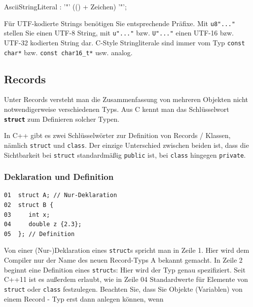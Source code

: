 \documentclass[a4paper]{report}
\begin{document}
\begin{rail}
	AsciiStringLiteral : '"' (() + Zeichen) '"';
\end{rail}
Für UTF-kodierte Strings benötigen Sie entsprechende Präfixe. Mit \texttt{u8"..."} stellen Sie einen UTF-8 String, mit \texttt{u"..."} bzw. \texttt{U"..."} einen UTF-16 bzw. UTF-32 kodierten String dar. C-Style Stringliterale sind immer vom Typ \texttt{const char*} bzw. \texttt{const char16\_t*} usw. analog.

\subsection{Records}
Unter Records versteht man die Zusammenfassung von mehreren Objekten nicht notwendigerweise verschiedenen Typs. Aus C kennt man das Schlüsselwort \texttt{\textbf{struct}} zum Definieren solcher Typen.

In C++ gibt es zwei Schlüsselwörter zur Definition von Records / Klassen, nämlich \texttt{struct} und \texttt{class}. Der einzige Unterschied zwischen beiden ist, dass die Sichtbarkeit bei \texttt{struct} standardmäßig \texttt{public} ist, bei \texttt{class} hingegen \texttt{private}.

\subsubsection{Deklaration und Definition}

\begin{lstlisting}
01	struct A; // Nur-Deklaration
02	struct B { 
03	   int x;
04	   double z {2.3};
05	}; // Definition
\end{lstlisting}

Von einer (Nur-)Deklaration eines \texttt{struct}s spricht man in Zeile 1. Hier wird dem Compiler nur der Name des neuen Record-Typs A bekannt gemacht.
In Zeile 2 beginnt eine Definition eines \texttt{struct}s: Hier wird der Typ genau spezifiziert.
Seit C++11 ist es außerdem erlaubt, wie in Zeile 04 Standardwerte für Elemente von \texttt{struct} oder \texttt{class} festzulegen.
Beachten Sie, dass Sie Objekte (Variablen) von einem Record - Typ erst dann anlegen können, wenn 


\end{document}
